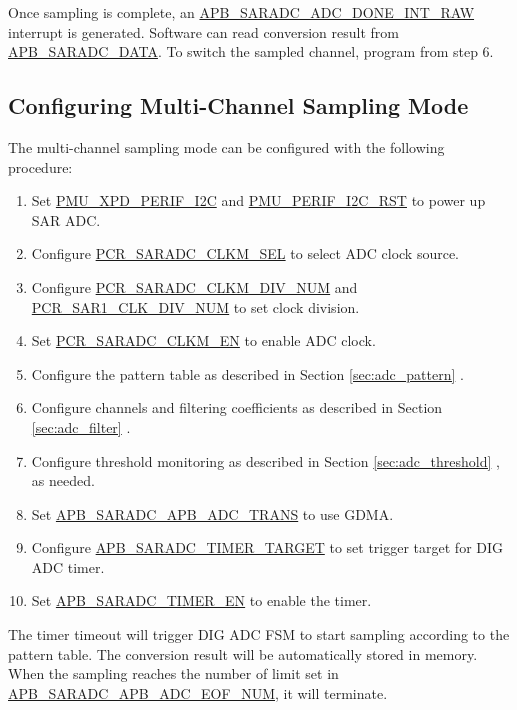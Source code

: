 \documentclass[main\_\_EN.tex]{subfiles}
\begin{document}
Once sampling is complete, an \hyperref[fielddesc:APBSARADCDONEINTRAW]{APB\_SARADC\_ADC\_DONE\_INT\_RAW} interrupt is generated. Software can read conversion result from \hyperref[fielddesc:APBSARADCDATA]{APB\_SARADC\_DATA}. To switch the sampled channel, program from step 6.

\subsection{Configuring Multi-Channel Sampling Mode}

The multi-channel sampling mode can be configured with the following procedure:

\begin{enumerate}
    \item Set \hyperref[fielddesc:PMUXPDPERIFI2C]{PMU\_XPD\_PERIF\_I2C} and \hyperref[fielddesc:PMUPERIFI2CRST]{PMU\_PERIF\_I2C\_RST} to power up SAR ADC.
    \item Configure \hyperref[fielddesc:PCRSARADCCLKMSEL]{PCR\_SARADC\_CLKM\_SEL} to select ADC clock source.
    \item Configure \hyperref[fielddesc:PCRSARADCCLKMDIVNUM]{PCR\_SARADC\_CLKM\_DIV\_NUM} and \hyperref[fielddesc:PCRSAR1CLKDIVNUM]{PCR\_SAR1\_CLK\_DIV\_NUM} to set clock division.
    \item Set \hyperref[fielddesc:PCRSARADCCLKMEN]{PCR\_SARADC\_CLKM\_EN} to enable ADC clock.
    \item Configure the pattern table as described in Section \ref{sec:adc_pattern} \textit{}.
    \item Configure channels and filtering coefficients as described in Section \ref{sec:adc_filter} \textit{}.
    \item Configure threshold monitoring as described in Section \ref{sec:adc_threshold} \textit{}, as needed.
    \item Set \hyperref[fielddesc:APBSARADCAPBADCTRANS]{APB\_SARADC\_APB\_ADC\_TRANS} to use GDMA.
    \item Configure \hyperref[fielddesc:APBSARADCTIMERTARGET]{APB\_SARADC\_TIMER\_TARGET} to set trigger target for DIG ADC timer.
    \item Set \hyperref[fielddesc:APBSARADCTIMEREN]{APB\_SARADC\_TIMER\_EN} to enable the timer.
\end{enumerate}

The timer timeout will trigger DIG ADC FSM to start sampling according to the pattern table. The conversion result will be automatically stored in memory. When the sampling reaches the number of limit set in  \hyperref[fielddesc:APBSARADCAPBADCEOFNUM]{APB\_SARADC\_APB\_ADC\_EOF\_NUM}, it will terminate.
\end{document}
